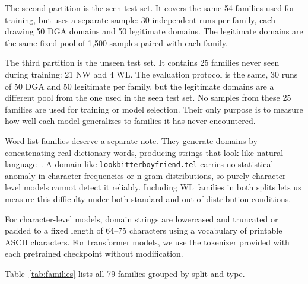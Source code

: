 \documentclass[conference]{IEEEtran}
\begin{document}
  The second partition is the seen test set. It covers the same 54 families used for training, but uses a separate sample: 30 independent runs per family,    
  each drawing 50 DGA domains and 50 legitimate domains. The legitimate domains are the same fixed pool of 1,500 samples paired with each family.             
   
  The third partition is the unseen test set. It contains 25 families never seen during training: 21 NW and 4 WL. The evaluation protocol is the same, 30 runs
   of 50 DGA and 50 legitimate per family, but the legitimate domains are a different pool from the one used in the seen test set. No samples from these 25
  families are used for training or model selection. Their only purpose is to measure how well each model generalizes to families it has never encountered.   
                                         

Word list families deserve a separate note. They generate domains by concatenating real dictionary words, producing strings that look like natural language~\cite{plohmann_dga, leyva2026expert}. A domain like \texttt{lookbitterboyfriend.tel} carries no statistical anomaly in character frequencies or n-gram distributions, so purely character-level models cannot detect it reliably. Including WL families in both splits lets us measure this difficulty under both standard and out-of-distribution conditions.

For character-level models, domain strings are lowercased and truncated or padded to a fixed length of 64--75 characters using a vocabulary of printable ASCII characters. For transformer models, we use the tokenizer provided with each pretrained checkpoint without modification.                               
  


Table~\ref{tab:families} lists all 79 families grouped by split and type.
\end{document}
